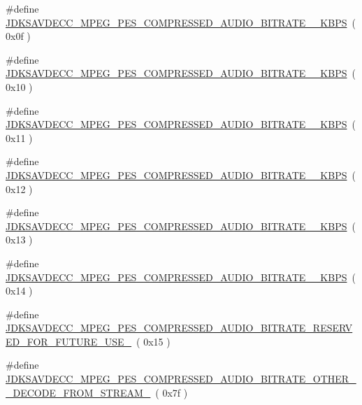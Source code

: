 \begin{DoxyCompactItemize}
\#define \hyperlink{group__mpeg__pes__compressed__audio__bitrate_ga5961692f268ad1b2e829576625923f9d}{J\+D\+K\+S\+A\+V\+D\+E\+C\+C\+\_\+\+M\+P\+E\+G\+\_\+\+P\+E\+S\+\_\+\+C\+O\+M\+P\+R\+E\+S\+S\+E\+D\+\_\+\+A\+U\+D\+I\+O\+\_\+\+B\+I\+T\+R\+A\+T\+E\+\_\+\_\+\+K\+B\+PS}~( 0x0f )
\item 
\#define \hyperlink{group__mpeg__pes__compressed__audio__bitrate_gad397138b0fcbd2506252c56ecf3ae081}{J\+D\+K\+S\+A\+V\+D\+E\+C\+C\+\_\+\+M\+P\+E\+G\+\_\+\+P\+E\+S\+\_\+\+C\+O\+M\+P\+R\+E\+S\+S\+E\+D\+\_\+\+A\+U\+D\+I\+O\+\_\+\+B\+I\+T\+R\+A\+T\+E\+\_\+\_\+\+K\+B\+PS}~( 0x10 )
\item 
\#define \hyperlink{group__mpeg__pes__compressed__audio__bitrate_ga6bbc0bb0b60b761f6a4e2e22977f2ed5}{J\+D\+K\+S\+A\+V\+D\+E\+C\+C\+\_\+\+M\+P\+E\+G\+\_\+\+P\+E\+S\+\_\+\+C\+O\+M\+P\+R\+E\+S\+S\+E\+D\+\_\+\+A\+U\+D\+I\+O\+\_\+\+B\+I\+T\+R\+A\+T\+E\+\_\+\_\+\+K\+B\+PS}~( 0x11 )
\item 
\#define \hyperlink{group__mpeg__pes__compressed__audio__bitrate_gadce539410ccf6ce23fe644756c7918f2}{J\+D\+K\+S\+A\+V\+D\+E\+C\+C\+\_\+\+M\+P\+E\+G\+\_\+\+P\+E\+S\+\_\+\+C\+O\+M\+P\+R\+E\+S\+S\+E\+D\+\_\+\+A\+U\+D\+I\+O\+\_\+\+B\+I\+T\+R\+A\+T\+E\+\_\+\_\+\+K\+B\+PS}~( 0x12 )
\item 
\#define \hyperlink{group__mpeg__pes__compressed__audio__bitrate_ga0fd6b9542a814a134df9fdcc9bca62c6}{J\+D\+K\+S\+A\+V\+D\+E\+C\+C\+\_\+\+M\+P\+E\+G\+\_\+\+P\+E\+S\+\_\+\+C\+O\+M\+P\+R\+E\+S\+S\+E\+D\+\_\+\+A\+U\+D\+I\+O\+\_\+\+B\+I\+T\+R\+A\+T\+E\+\_\+\_\+\+K\+B\+PS}~( 0x13 )
\item 
\#define \hyperlink{group__mpeg__pes__compressed__audio__bitrate_ga72bb68bba5f282e334f814368280626a}{J\+D\+K\+S\+A\+V\+D\+E\+C\+C\+\_\+\+M\+P\+E\+G\+\_\+\+P\+E\+S\+\_\+\+C\+O\+M\+P\+R\+E\+S\+S\+E\+D\+\_\+\+A\+U\+D\+I\+O\+\_\+\+B\+I\+T\+R\+A\+T\+E\+\_\+\_\+\+K\+B\+PS}~( 0x14 )
\item 
\#define \hyperlink{group__mpeg__pes__compressed__audio__bitrate_ga371587cfa6a44d4566c632eda89abb83}{J\+D\+K\+S\+A\+V\+D\+E\+C\+C\+\_\+\+M\+P\+E\+G\+\_\+\+P\+E\+S\+\_\+\+C\+O\+M\+P\+R\+E\+S\+S\+E\+D\+\_\+\+A\+U\+D\+I\+O\+\_\+\+B\+I\+T\+R\+A\+T\+E\+\_\+\+R\+E\+S\+E\+R\+V\+E\+D\+\_\+\+F\+O\+R\+\_\+\+F\+U\+T\+U\+R\+E\+\_\+\+U\+S\+E\+\_\+}~( 0x15 )
\item 
\#define \hyperlink{group__mpeg__pes__compressed__audio__bitrate_ga0635f43596b6e495454052614ca9389e}{J\+D\+K\+S\+A\+V\+D\+E\+C\+C\+\_\+\+M\+P\+E\+G\+\_\+\+P\+E\+S\+\_\+\+C\+O\+M\+P\+R\+E\+S\+S\+E\+D\+\_\+\+A\+U\+D\+I\+O\+\_\+\+B\+I\+T\+R\+A\+T\+E\+\_\+\+O\+T\+H\+E\+R\+\_\+\+\_\+\+D\+E\+C\+O\+D\+E\+\_\+\+F\+R\+O\+M\+\_\+\+S\+T\+R\+E\+A\+M\+\_\+}~( 0x7f )
\end{DoxyCompactItemize}


